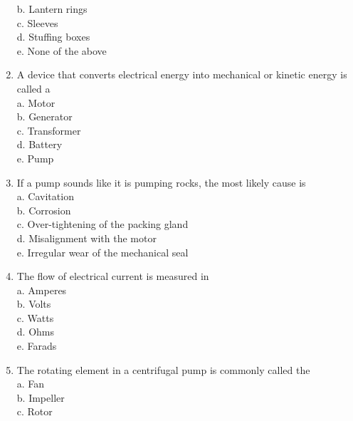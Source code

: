 \begin{enumerate}[1.]
b. Lantern rings\\

c. Sleeves\\

d. Stuffing boxes\\

e. None of the above \\

\item A device that converts electrical energy into mechanical or kinetic energy is called a\\

a. Motor\\

b. Generator\\

c. Transformer\\

d. Battery\\

e. Pump\\

\item If a pump sounds like it is pumping rocks, the most likely cause is\\
a. Cavitation\\

b. Corrosion\\

c. Over-tightening of the packing gland\\

d. Misalignment with the motor\\

e. Irregular wear of the mechanical seal\\

\item The flow of electrical current is measured in\\
a. Amperes\\
b. Volts\\
c. Watts\\
d. Ohms\\
e. Farads\\

  \item The rotating element in a centrifugal pump is commonly called the\\
a. Fan\\

b. Impeller\\

c. Rotor\\


\end{enumerate}
